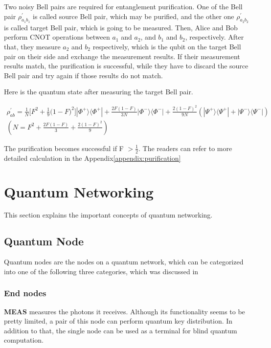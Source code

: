 Two noisy Bell pairs are required for entanglement purification. One of the Bell pair $\rho^{'}_{a_1 b_1}$ is called source Bell pair, which may be purified, and the other one $\rho^{'}_{a_2 b_2}$  is called target Bell pair, which is going to be measured. 
Then, Alice and Bob perform CNOT operations between $a_1$ and $a_2$, and $b_1$ and $b_2$, respectively.
After that, they measure $a_2$ and $b_2$ respectively, which is the qubit on the target Bell pair on their side and exchange the measurement results. 
If their measurement results match, the purification is successful, while they have to discard the source Bell pair and try again if those results do not match.

Here is the quantum state after measuring the target Bell pair.

\begin{multline*}
\rho^{'}_{ab} = \frac{1}{N} \big[ F^2 + \frac{1}{9}\big(1-F \big)^2\big]|\Phi^+\rangle\langle\Phi^+| + \frac{2F(1-F)}{3N}|\Phi^-\rangle\langle\Phi^-| + \frac{2(1-F)^2}{9N}(|\Psi^+\rangle\langle\Psi^+| + |\Psi^-\rangle\langle\Psi^-|) \\
(N = F^2 + \frac{2F(1-F)}{3} + \frac{2(1-F)^2}{9})
\end{multline*}

The purification becomes successful if F  $> \frac{1}{2}$. The readers can refer to more detailed calculation in the Appendix\ref{appendix:purification}

\section{Quantum Networking}

This section explains the important concepts of quantum networking.

\subsection{Quantum Node}

Quantum nodes are the nodes on a quantum network, which can be categorized into one of the following three categories, which was discussed in \cite{van2022quantum}

\subsubsection{End nodes}

\textbf{MEAS} measures the photons it receives. Although its functionality seems to be pretty limited, a pair of this node can perform quantum key distribution. In addition to that, the single node can be used as a terminal for blind quantum computation.

